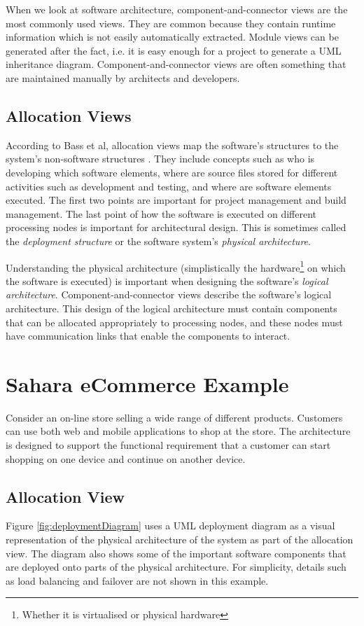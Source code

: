 When we look at software architecture, component-and-connector views are the most commonly used views.
They are common because they contain runtime information which is not easily automatically extracted.
Module views can be generated after the fact, i.e. it is easy enough for a project to generate a UML inheritance diagram.
Component-and-connector views are often something that are maintained manually by architects and developers.

\subsection{Allocation Views}
According to Bass et al, allocation views map the software's structures to the system's non-software structures \cite{bass2021software}.
They include concepts such as who is developing which software elements,
where are source files stored for different activities such as development and testing,
and where are software elements executed.
The first two points are important for project management and build management.
The last point of how the software is executed on different processing nodes is important for architectural design.
This is sometimes called the \emph{deployment structure} or the software system's \emph{physical architecture}.

Understanding the physical architecture (simplistically the hardware\footnote{Whether it is virtualised or physical hardware}
on which the software is executed) is important when designing the software's \emph{logical architecture}.
Component-and-connector views describe the software's logical architecture.
This design of the logical architecture must contain components that can be allocated appropriately to processing nodes,
and these nodes must have communication links that enable the components to interact.

\section{Sahara eCommerce Example}\label{sec:storeExample}
Consider an on-line store selling a wide range of different products. Customers can use both web and mobile applications to shop at the store.
The architecture is designed to support the functional requirement that a customer can start shopping on one device and continue on another device.

\subsection{Allocation View}\label{sec:storeAllocView}
Figure \ref{fig:deploymentDiagram} uses a UML deployment diagram as a visual representation of the physical architecture of the system as part of the allocation view.
The diagram also shows some of the important software components that are deployed onto parts of the physical architecture.
For simplicity, details such as load balancing and failover are not shown in this example.

